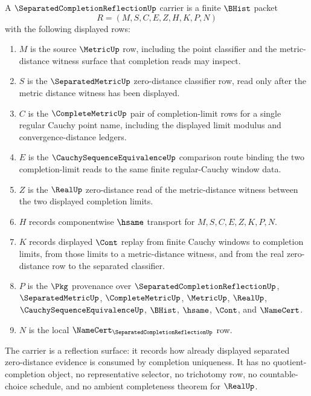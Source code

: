 \begin{definition}
\label{def:separated-completion-reflection-carrier}
A $\SeparatedCompletionReflectionUp$ carrier is a finite $\BHist$ packet
$$
R=(M,S,C,E,Z,H,K,P,N)
$$
with the following displayed rows:
\begin{enumerate}
\item $M$ is the source $\MetricUp$ row, including the point classifier and the metric-distance witness surface that completion reads may inspect.
\item $S$ is the $\SeparatedMetricUp$ zero-distance classifier row, read only after the metric distance witness has been displayed.
\item $C$ is the $\CompleteMetricUp$ pair of completion-limit rows for a single regular Cauchy point name, including the displayed limit modulus and convergence-distance ledgers.
\item $E$ is the $\CauchySequenceEquivalenceUp$ comparison route binding the two completion-limit reads to the same finite regular-Cauchy window data.
\item $Z$ is the $\RealUp$ zero-distance read of the metric-distance witness between the two displayed completion limits.
\item $H$ records componentwise $\hsame$ transport for $M,S,C,E,Z,K,P,N$.
\item $K$ records displayed $\Cont$ replay from finite Cauchy windows to completion limits, from those limits to a metric-distance witness, and from the real zero-distance row to the separated classifier.
\item $P$ is the $\Pkg$ provenance over $\SeparatedCompletionReflectionUp$, $\SeparatedMetricUp$, $\CompleteMetricUp$, $\MetricUp$, $\RealUp$, $\CauchySequenceEquivalenceUp$, $\BHist$, $\hsame$, $\Cont$, and $\NameCert$.
\item $N$ is the local $\NameCert_{\SeparatedCompletionReflectionUp}$ row.
\end{enumerate}
The carrier is a reflection surface: it records how already displayed separated zero-distance evidence is consumed by completion uniqueness. It has no quotient-completion object, no representative selector, no trichotomy row, no countable-choice schedule, and no ambient completeness theorem for $\RealUp$.
\end{definition}

